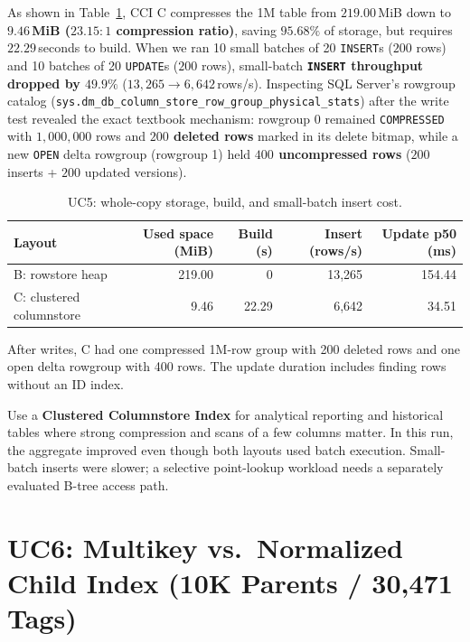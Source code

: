 As shown in Table~\ref{tab:uc5-tradeoff}, CCI C compresses the 1M table from $219.00$\,MiB down to \textbf{$9.46$\,MiB ($23.15 : 1$ compression ratio)}, saving $95.68\%$ of storage, but requires $22.29$\,seconds to build. When we ran 10 small batches of 20 \texttt{INSERT}s ($200$ rows) and 10 batches of 20 \texttt{UPDATE}s ($200$ rows), small-batch \textbf{\texttt{INSERT} throughput dropped by $49.9\%$} ($13,265 \rightarrow 6,642$\,rows/s). Inspecting SQL Server's rowgroup catalog (\texttt{sys.dm\_db\_column\_store\_row\_group\_physical\_stats}) after the write test revealed the exact textbook mechanism: rowgroup 0 remained \texttt{COMPRESSED} with $1,000,000$ rows and \textbf{$200$ deleted rows} marked in its delete bitmap, while a new \texttt{OPEN} delta rowgroup (rowgroup 1) held \textbf{$400$ uncompressed rows} ($200$ inserts + $200$ updated versions).

\begin{table}[H]
\centering\small
\caption{UC5: whole-copy storage, build, and small-batch insert cost.}
\label{tab:uc5-tradeoff}
\begin{tabular}{@{}l r r r r@{}}
\toprule
Layout & Used space (MiB) & Build (s) & Insert (rows/s) & Update p50 (ms)\\
\midrule
B: rowstore heap & 219.00 & 0 & 13,265 & 154.44\\
C: clustered columnstore & 9.46 & 22.29 & 6,642 & 34.51\\
\bottomrule
\end{tabular}
\par\smallskip\scriptsize\raggedright After writes, C had one compressed 1M-row group with 200 deleted rows and one open delta rowgroup with 400 rows. The update duration includes finding rows without an ID index.\par
\end{table}

Use a \textbf{Clustered Columnstore Index} for analytical reporting and historical tables where strong compression and scans of a few columns matter. In this run, the aggregate improved even though both layouts used batch execution. Small-batch inserts were slower; a selective point-lookup workload needs a separately evaluated B-tree access path.

\FloatBarrier
\section{UC6: Multikey vs.\ Normalized Child Index (10K Parents / 30,471 Tags)}

